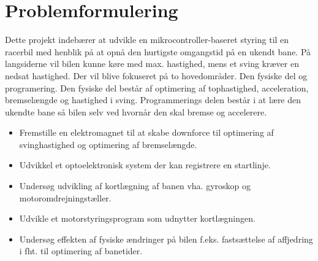 
\section{Problemformulering}
Dette projekt indebærer at udvikle en mikrocontroller-baseret styring til en racerbil med henblik på at opnå den hurtigste omgangstid på en ukendt bane.
På langsiderne vil bilen kunne køre med max. hastighed, mens et sving kræver en nedsat hastighed.
Der vil blive fokuseret på to hovedområder. Den fysiske del og programering. Den fysiske del består af optimering af tophastighed, acceleration, bremselængde og hastighed i sving.
Programmerings delen består i at lære den ukendte bane så bilen selv ved hvornår den skal bremse og accelerere.
\begin{itemize}
\item Fremstille en elektromagnet til at skabe downforce til optimering af svinghastighed og optimering af bremselængde.
\item Udvikkel et optoelektronisk system der kan registrere en startlinje.
\item Undersøg udvikling af kortlægning af banen vha. gyroskop og motoromdrejningstæller.
\item Udvikle et motorstyringsprogram som udnytter kortlægningen.
\item Undersøg effekten af fysiske ændringer på bilen f.eks. fastsættelse af affjedring i fht. til optimering af banetider.
\end{itemize}
